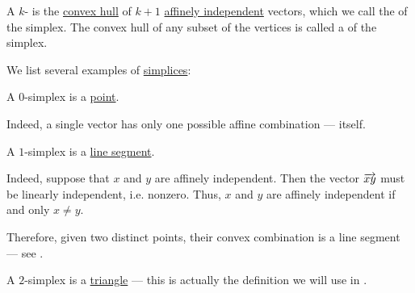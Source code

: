 \begin{definition}\label{def:simplex}
  A \( k \)- is the \hyperref[def:convex_hull]{convex hull} of \( k + 1 \) \hyperref[def:affine_dependence]{affinely independent} vectors, which we call the  of the simplex. The convex hull of any subset of the vertices is called a  of the simplex.
\end{definition}

\begin{example}\label{ex:def:simplex}
  We list several examples of \hyperref[def:simplex]{simplices}:
  \begin{thmenum}
     A \( 0 \)-simplex is a \hyperref[rem:point]{point}.

    Indeed, a single vector has only one possible affine combination --- itself.

     A \( 1 \)-simplex is a \hyperref[def:line_segment]{line segment}.

    Indeed, suppose that \( x \) and \( y \) are affinely independent. Then the vector \( \overrightarrow{xy} \) must be linearly independent, i.e. nonzero. Thus, \( x \) and \( y \) are affinely independent if and only \( x \neq y \).

    Therefore, given two distinct points, their convex combination is a line segment --- see .

     A \( 2 \)-simplex is a \hyperref[def:triangle]{triangle} --- this is actually the definition we will use in .
  \end{thmenum}
\end{example}
